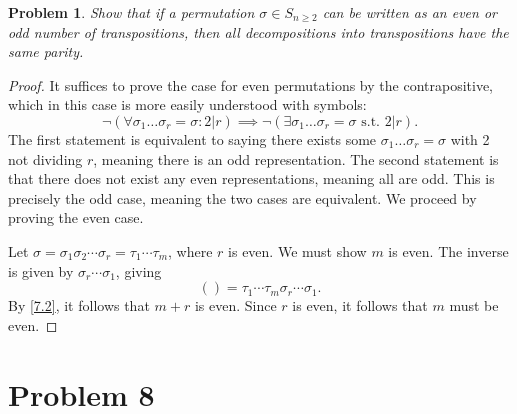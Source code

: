 \documentclass[11pt, letterpaper]{article}
\theoremstyle{plain}
\newtheorem{problem}{Problem}[section]
\begin{document}
\begin{problem}
	Show that if a permutation $\sigma \in S_{n\geq 2} $ can be written as an even or odd number of transpositions, then all decompositions into transpositions have the same parity.
\end{problem}
\begin{proof}
	It suffices to prove the case for even permutations by the contrapositive, which in this case is more easily understood with symbols:
	\[
		\neg(\forall \sigma _1 \ldots \sigma _r=\sigma : 2|r) \implies \neg (\exists \sigma _1 \ldots \sigma _r = \sigma \text{ s.t. } 2|r)
	.\]
	The first statement is equivalent to saying there exists some $\sigma _1\ldots \sigma _r=\sigma $ with 2 not dividing $r$, meaning there is an odd representation. The second statement is that there does not exist any even representations, meaning all are odd. This is precisely the odd case, meaning the two cases are equivalent. We proceed by proving the even case.

	Let $\sigma =\sigma _1\sigma _2\cdots \sigma _r=\tau _1\cdots \tau _m$, where $r$ is even. We must show $m$ is even. The inverse is given by $\sigma _r\cdots\sigma _1$, giving
	\[
		( )=\tau _1\cdots\tau _m\sigma _r\cdots\sigma _1
	.\]
	By \cref{7.2}, it follows that $m+r$ is even. Since $r$ is even, it follows that $m$ must be even.
\end{proof}



\section{Problem 8}
\end{document}
